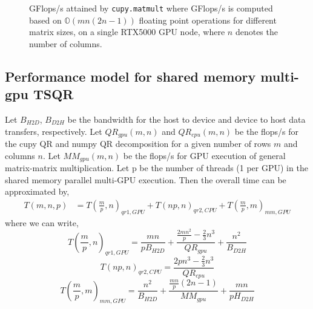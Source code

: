 \documentclass{article}
\begin{document}
\begin{figure}[!bhp]
    \centering
    \caption{GFlops/s  attained by \texttt{cupy.matmult} where  GFlops/s is computed based on $\mathbb{O}(mn(2n-1))$ floating point operations for different matrix sizes, on a single RTX5000 GPU node, where $n$ denotes the number of columns.}
\end{figure}


\subsection{Performance model for shared memory multi-gpu TSQR}
Let $B_{H2D}$, $B_{D2H}$ be the bandwidth for the host to device and device to host data transfers, respectively. Let $QR_{gpu}(m,n)$ and $QR_{cpu}(m,n)$ be the flops/s for the cupy QR and numpy QR decomposition for a given number of rows $m$ and columns $n$. Let $MM_{gpu}(m,n)$ be the flops/s for GPU execution of general matrix-matrix multiplication. Let p be the number of threads (1 per GPU) in the shared memory parallel multi-GPU execution. Then the overall time can be approximated by, 
\begin{align}
    T(m,n,p) &= T(\frac{m}{p}, n)_{qr1,GPU}  + T(np,n)_{qr2,CPU} + T(\frac{m}{p},m)_{mm,GPU} \label{eq:qr_sm}
\end{align} where we can write, 
\begin{equation}
    T(\frac{m}{p}, n)_{qr1,GPU} = \frac{mn}{pB_{H2D}} + \frac{\frac{2mn^2}{p} -\frac{2}{3}n^3}{QR_{gpu}} + \frac{n^2}{B_{D2H}} \label{eq:qr1_sm}
\end{equation}
\begin{equation}
    T(np,n)_{qr2,CPU} = \frac{2pn^3 -\frac{2}{3}n^3}{QR_{cpu}} \label{eq:qr2_sm}
\end{equation}
\begin{equation}
    T(\frac{m}{p},m)_{mm,GPU} = \frac{n^2}{B_{H2D}} + \frac{\frac{mn}{p}(2n-1)}{MM_{gpu}} + \frac{mn}{pH_{D2H}} \label{eq:mm_sm}
\end{equation}
\end{document}
